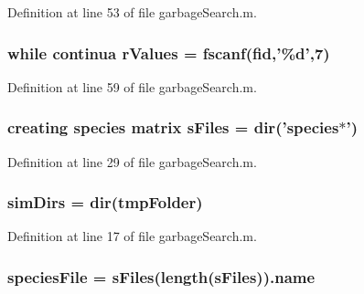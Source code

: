 Definition at line 53 of file garbage\+Search.\+m.

\hypertarget{a00027_a436a6968124e560649654a4abbd9dac6}{
\subsubsection[{r\+Values}]{\setlength{\rightskip}{0pt plus 5cm}while {\bf continua} r\+Values = {\bf fscanf}({\bf fid},'\%d',7)}}\label{a00027_a436a6968124e560649654a4abbd9dac6}


Definition at line 59 of file garbage\+Search.\+m.

\hypertarget{a00027_a0cf551ea63e8b67362ae2ab776072d1f}{
\subsubsection[{s\+Files}]{\setlength{\rightskip}{0pt plus 5cm}creating {\bf species} matrix s\+Files = {\bf dir}('{\bf species}$\ast$')}}\label{a00027_a0cf551ea63e8b67362ae2ab776072d1f}


Definition at line 29 of file garbage\+Search.\+m.

\hypertarget{a00027_aae5035eb84b89176ed5b06e136325eff}{
\subsubsection[{sim\+Dirs}]{\setlength{\rightskip}{0pt plus 5cm}sim\+Dirs = {\bf dir}({\bf tmp\+Folder})}}\label{a00027_aae5035eb84b89176ed5b06e136325eff}


Definition at line 17 of file garbage\+Search.\+m.

\hypertarget{a00027_a7da0c82834970c5f3c3d9224ab832577}{
\subsubsection[{species\+File}]{\setlength{\rightskip}{0pt plus 5cm}species\+File = {\bf s\+Files}(length({\bf s\+Files})).{\bf name}}}\label{a00027_a7da0c82834970c5f3c3d9224ab832577}


